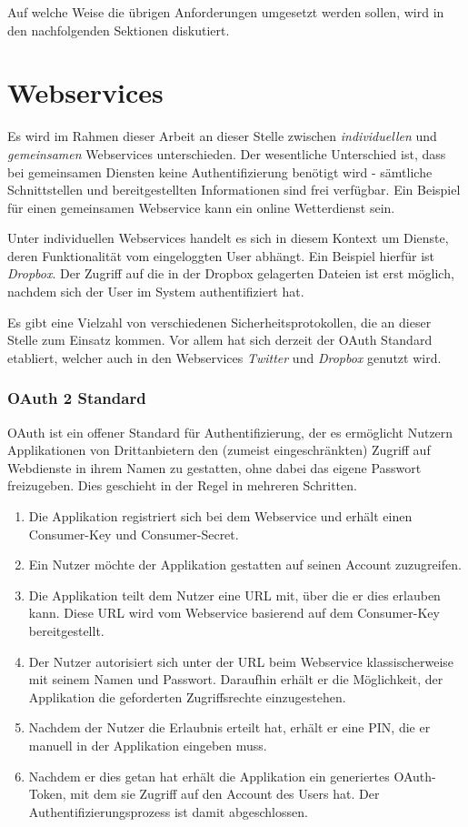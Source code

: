 Auf welche Weise die übrigen Anforderungen umgesetzt werden sollen, wird in den nachfolgenden Sektionen diskutiert.


\section{Webservices}
Es wird im Rahmen dieser Arbeit an dieser Stelle zwischen \textit{individuellen} und \textit{gemeinsamen} Webservices unterschieden. Der wesentliche Unterschied ist, dass bei gemeinsamen Diensten keine Authentifizierung benötigt wird - sämtliche Schnittstellen und bereitgestellten Informationen sind frei verfügbar. Ein Beispiel für einen gemeinsamen Webservice kann ein online Wetterdienst sein. 

Unter individuellen Webservices handelt es sich in diesem Kontext um Dienste, deren Funktionalität vom eingeloggten User abhängt. Ein Beispiel hierfür ist \textit{Dropbox}. Der Zugriff auf die in der Dropbox gelagerten Dateien ist erst möglich, nachdem sich der User im System authentifiziert hat. 

Es gibt eine Vielzahl von verschiedenen Sicherheitsprotokollen, die an dieser Stelle zum Einsatz kommen. Vor allem hat sich derzeit der OAuth Standard etabliert, welcher auch in den Webservices \textit{Twitter} und \textit{Dropbox} genutzt wird.\\

\subsubsection{OAuth 2 Standard}
\label{subsubsec:oauth}
OAuth \cite{oauth} ist ein offener Standard für Authentifizierung, der es ermöglicht Nutzern Applikationen von Drittanbietern den (zumeist eingeschränkten) Zugriff auf Webdienste in ihrem Namen zu gestatten, ohne dabei das eigene Passwort freizugeben. Dies geschieht in der Regel in mehreren Schritten.

\begin{enumerate}
\item Die Applikation registriert sich bei dem Webservice und erhält einen Consumer-Key und Consumer-Secret.
\item Ein Nutzer möchte der Applikation gestatten auf seinen Account zuzugreifen.
\item Die Applikation teilt dem Nutzer eine URL mit, über die er dies erlauben kann. Diese URL wird vom Webservice basierend auf dem Consumer-Key bereitgestellt. 
\item Der Nutzer autorisiert sich unter der URL beim Webservice klassischerweise mit seinem Namen und Passwort. Daraufhin erhält er die Möglichkeit, der Applikation die geforderten Zugriffsrechte einzugestehen.
\item Nachdem der Nutzer die Erlaubnis erteilt hat, erhält er eine PIN, die er manuell in der Applikation eingeben muss. 
\item Nachdem er dies getan hat erhält die Applikation ein generiertes OAuth-Token, mit dem sie Zugriff auf den Account des Users hat. Der Authentifizierungsprozess ist damit abgeschlossen.
\end{enumerate}


